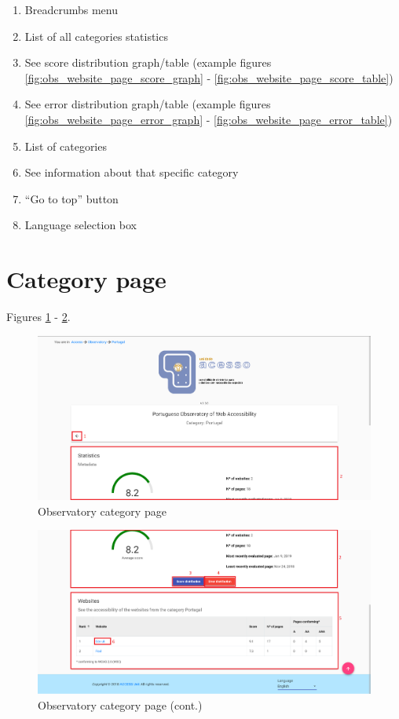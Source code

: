 \begin{enumerate}
    \item Breadcrumbs menu
    \item List of all categories statistics
    \item See score distribution graph/table (example figures \ref{fig:obs_website_page_score_graph} - \ref{fig:obs_website_page_score_table})
    \item See error distribution graph/table (example figures \ref{fig:obs_website_page_error_graph} - \ref{fig:obs_website_page_error_table})
    \item List of categories
    \item See information about that specific category
    \item ``Go to top'' button
    \item Language selection box
\end{enumerate}

\clearpage

\section{Category page}

Figures \ref{fig:obs_category_page} - \ref{fig:obs_category_page_2}.

\begin{figure}[H]
    \centering
    \includegraphics[width=\linewidth]{lib/images/observatory/observatory_category_page.png}
    \caption{Observatory category page}
    \label{fig:obs_category_page}
\end{figure}

\begin{figure}[H]
    \centering
    \includegraphics[width=\linewidth]{lib/images/observatory/observatory_category_page_2.png}
    \caption{Observatory category page (cont.)}
    \label{fig:obs_category_page_2}
\end{figure}

